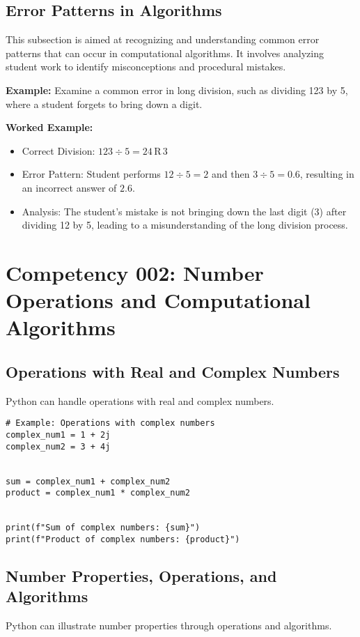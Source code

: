 \documentclass{book}
\begin{document}
\subsection{Error Patterns in Algorithms}
This subsection is aimed at recognizing and understanding common error patterns that can occur in computational algorithms. It involves analyzing student work to identify misconceptions and procedural mistakes.


\textbf{Example:} Examine a common error in long division, such as dividing 123 by 5, where a student forgets to bring down a digit.


\textbf{Worked Example:}
\begin{itemize}
        \item Correct Division: \(123 \div 5 = 24 \, \text{R} \, 3\)
        \item Error Pattern: Student performs \(12 \div 5 = 2\) and then \(3 \div 5 = 0.6\), resulting in an incorrect answer of \(2.6\).
        \item Analysis: The student's mistake is not bringing down the last digit (3) after dividing 12 by 5, leading to a misunderstanding of the long division process.
\end{itemize}




\section{Competency 002: Number Operations and Computational Algorithms}
\subsection{Operations with Real and Complex Numbers}
Python can handle operations with real and complex numbers.


\begin{lstlisting}[style=pythonstyle]
# Example: Operations with complex numbers
complex_num1 = 1 + 2j
complex_num2 = 3 + 4j


sum = complex_num1 + complex_num2
product = complex_num1 * complex_num2


print(f"Sum of complex numbers: {sum}")
print(f"Product of complex numbers: {product}")
\end{lstlisting}


\subsection{Number Properties, Operations, and Algorithms}
Python can illustrate number properties through operations and algorithms.
\end{document}
